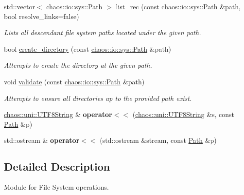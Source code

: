 \begin{DoxyCompactItemize}
std\-::vector$<$ \hyperlink{classchaos_1_1io_1_1sys_1_1_path}{chaos\-::io\-::sys\-::\-Path} $>$ \hyperlink{namespacechaos_1_1io_1_1sys_a1d30db6ee911af61479ed4af9f963d1c}{list\-\_\-rec} (const \hyperlink{classchaos_1_1io_1_1sys_1_1_path}{chaos\-::io\-::sys\-::\-Path} \&path, bool resolve\-\_\-links=false)
\begin{DoxyCompactList}\small\item\em Lists all descendant file system paths located under the given path. \end{DoxyCompactList}\item 
bool \hyperlink{namespacechaos_1_1io_1_1sys_a6bcdadf916b110395f4a2627c049da11}{create\-\_\-directory} (const \hyperlink{classchaos_1_1io_1_1sys_1_1_path}{chaos\-::io\-::sys\-::\-Path} \&path)
\begin{DoxyCompactList}\small\item\em Attempts to create the directory at the given path. \end{DoxyCompactList}\item 
void \hyperlink{namespacechaos_1_1io_1_1sys_a15e20b105c40cf4d73b13afe87ce1781}{validate} (const \hyperlink{classchaos_1_1io_1_1sys_1_1_path}{chaos\-::io\-::sys\-::\-Path} \&path)
\begin{DoxyCompactList}\small\item\em Attempts to ensure all directories up to the provided path exist. \end{DoxyCompactList}\item 
\hypertarget{namespacechaos_1_1io_1_1sys_a669178b3843d1716570b4b5ca8fd417d}{\hyperlink{classchaos_1_1uni_1_1_u_t_f8_string}{chaos\-::uni\-::\-U\-T\-F8\-String} \& {\bfseries operator$<$$<$} (\hyperlink{classchaos_1_1uni_1_1_u_t_f8_string}{chaos\-::uni\-::\-U\-T\-F8\-String} \&s, const \hyperlink{classchaos_1_1io_1_1sys_1_1_path}{Path} \&p)}\label{namespacechaos_1_1io_1_1sys_a669178b3843d1716570b4b5ca8fd417d}

\item 
\hypertarget{namespacechaos_1_1io_1_1sys_aa28fa69e8966c0ff55c3b59cdff9cebc}{std\-::ostream \& {\bfseries operator$<$$<$} (std\-::ostream \&stream, const \hyperlink{classchaos_1_1io_1_1sys_1_1_path}{Path} \&p)}\label{namespacechaos_1_1io_1_1sys_aa28fa69e8966c0ff55c3b59cdff9cebc}

\end{DoxyCompactItemize}


\subsection{Detailed Description}
Module for File System operations. 

